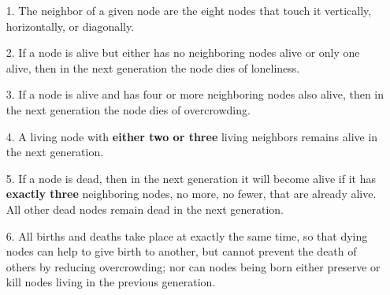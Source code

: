 \documentclass[]{article}
\begin{document}
\begin{itemize}

    \item[1.] The neighbor of a given node are the eight nodes that touch it vertically, horizontally, or diagonally.
    \item[2.] If a node is alive but either has no neighboring nodes alive or only one alive, then in the next generation the node dies of loneliness.
    \item[3.] If a node is alive and has four or more neighboring nodes also alive, then in the next generation the node dies of overcrowding.
    \item[4.] A living node with \textbf{either two or three} living neighbors remains alive in the next generation.
    \item[5.] If a node is dead, then in the next generation it will become alive if it has \textbf{exactly three} neighboring nodes, no more, no fewer, that are already alive. All other dead nodes remain dead in the next generation.
    \item[6.] All births and deaths take place at exactly the same time, so that dying nodes can help to give birth to another, but cannot prevent the death of others by reducing overcrowding; nor can nodes being born either preserve or kill nodes living in the previous generation.     
    
\end{itemize}

\\
\end{document}
